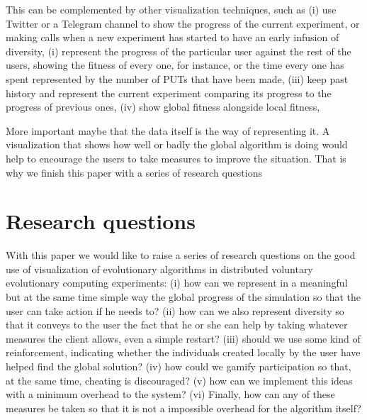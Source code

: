 \documentclass{sig-alternate}
\begin{document}
This can be complemented by other visualization techniques, such as 
(i) use Twitter or a Telegram channel to show the progress of
  the current experiment, or making calls when a new experiment has
  started to have an early infusion of diversity, 
(i) represent the progress of the particular user against the rest
  of the users, showing the fitness of every one, for instance, or the
  time every one has spent represented by the number of PUTs that have
  been made,
(iii) keep past history and represent the current experiment comparing its
  progress to the progress of previous ones,
(iv) show global fitness alongside local fitness, 

More important maybe that the data itself is the way of representing
it. A visualization that shows how well or badly the global algorithm
is doing would help to encourage the users to take measures to improve
the situation. That is why we finish this paper with a series of
research questions

\section{Research questions}

With this paper we would like to raise a series of research questions
on the good use of visualization of evolutionary algorithms in
distributed voluntary evolutionary computing experiments:
(i) how can we represent in a meaningful but at the same time simple
  way the global progress of the simulation so that the user can take
  action if he needs to?
(ii) how can we also represent diversity so that it conveys to the
  user the fact that he or she can help by taking whatever measures
  the client allows, even a simple restart?
(iii) should we use some kind of reinforcement, indicating whether the
  individuals created locally by the user have helped find the global solution?
(iv) how could we gamify participation so that, at the same time,
  cheating is discouraged?
(v) how can we implement this ideas with a minimum overhead to the system?  
(vi) Finally, how can any of these measures be taken so that it is
  not a impossible overhead for the algorithm itself?
\end{document}
